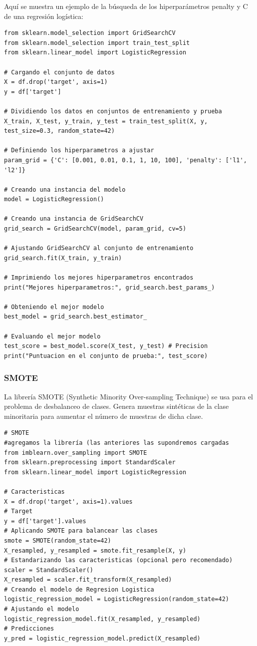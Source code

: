 \documentclass[a4paper, 12pt]{book}
\begin{document}
Aquí se muestra un ejemplo de la búsqueda de los hiperparámetros penalty y C de una regresión logística:
\begin{verbatim}
from sklearn.model_selection import GridSearchCV
from sklearn.model_selection import train_test_split
from sklearn.linear_model import LogisticRegression

# Cargando el conjunto de datos
X = df.drop('target', axis=1)
y = df['target']

# Dividiendo los datos en conjuntos de entrenamiento y prueba
X_train, X_test, y_train, y_test = train_test_split(X, y, test_size=0.3, random_state=42)

# Definiendo los hiperparametros a ajustar
param_grid = {'C': [0.001, 0.01, 0.1, 1, 10, 100], 'penalty': ['l1', 'l2']}

# Creando una instancia del modelo
model = LogisticRegression()

# Creando una instancia de GridSearchCV
grid_search = GridSearchCV(model, param_grid, cv=5)

# Ajustando GridSearchCV al conjunto de entrenamiento
grid_search.fit(X_train, y_train)

# Imprimiendo los mejores hiperparametros encontrados
print("Mejores hiperparametros:", grid_search.best_params_)

# Obteniendo el mejor modelo
best_model = grid_search.best_estimator_

# Evaluando el mejor modelo
test_score = best_model.score(X_test, y_test) # Precision
print("Puntuacion en el conjunto de prueba:", test_score)
\end{verbatim}

\subsubsection{SMOTE}
La librería SMOTE (Synthetic Minority Over-sampling Technique) se usa para el problema de desbalanceo de clases. Genera muestras sintéticas de la clase minoritaria para aumentar el número de muestras de dicha clase.
\begin{verbatim}
# SMOTE
#agregamos la librería (las anteriores las supondremos cargadas
from imblearn.over_sampling import SMOTE
from sklearn.preprocessing import StandardScaler
from sklearn.linear_model import LogisticRegression

# Caracteristicas
X = df.drop('target', axis=1).values
# Target
y = df['target'].values
# Aplicando SMOTE para balancear las clases
smote = SMOTE(random_state=42)
X_resampled, y_resampled = smote.fit_resample(X, y)
# Estandarizando las caracteristicas (opcional pero recomendado)
scaler = StandardScaler()
X_resampled = scaler.fit_transform(X_resampled)
# Creando el modelo de Regresion Logistica
logistic_regression_model = LogisticRegression(random_state=42)
# Ajustando el modelo
logistic_regression_model.fit(X_resampled, y_resampled)
# Predicciones
y_pred = logistic_regression_model.predict(X_resampled)
\end{verbatim}
\end{document}
